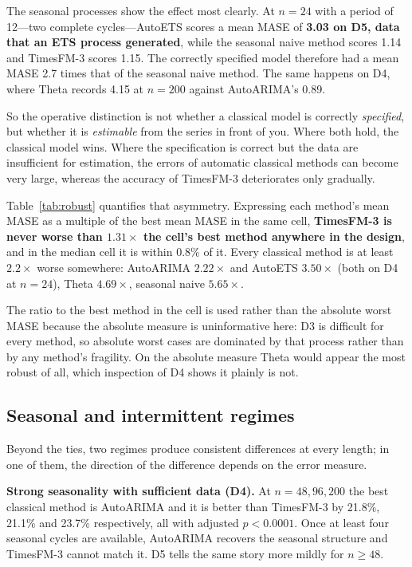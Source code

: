 \documentclass[11pt]{article}
\providecommand{\tableref}[1]{Table~\ref{#1}}
\begin{document}
The seasonal processes show the effect most clearly. At $n = 24$ with a period of 12---two complete
cycles---AutoETS scores a mean MASE of \textbf{3.03 on D5, data that an ETS process generated},
while the seasonal naive method scores 1.14 and TimesFM-3 scores 1.15. The
correctly specified model therefore had a mean MASE 2.7 times that of the seasonal naive method. The same happens on D4, where Theta
records 4.15 at $n = 200$ against AutoARIMA's 0.89.

So the operative distinction is not whether a classical model is correctly \emph{specified},
but whether it is \emph{estimable} from the series in front of you. Where both hold, the
classical model wins. Where the specification is correct but the data are insufficient for
estimation, the errors of automatic classical methods can become very large, whereas the accuracy
of TimesFM-3 deteriorates only gradually.

\tableref{tab:robust} quantifies that asymmetry. Expressing each method's mean MASE as a
multiple of the best mean MASE in the same cell, \textbf{TimesFM-3 is never worse than
$1.31\times$ the cell's best method anywhere in the design}, and in the median cell it is within
0.8\% of it. Every classical method is at least $2.2\times$ worse somewhere: AutoARIMA
$2.22\times$ and AutoETS $3.50\times$ (both on D4 at $n = 24$), Theta $4.69\times$, seasonal
naive $5.65\times$.

The ratio to the best method in the cell is used rather than the absolute worst MASE because the
absolute measure is uninformative here: D3 is difficult for every method, so absolute worst
cases are dominated by that process rather than by any method's fragility. On the absolute
measure Theta would appear the most robust of all, which inspection of D4 shows it plainly is
not.



\subsection{Seasonal and intermittent regimes}
\label{sec:regimes}

Beyond the ties, two regimes produce consistent differences at every length; in one of them,
the direction of the difference depends on the error measure.

\textbf{Strong seasonality with sufficient data (D4).} At
$n = 48, 96, 200$ the best classical method is AutoARIMA and it is better than TimesFM-3 by
21.8\%, 21.1\% and 23.7\% respectively, all with adjusted $p < 0.0001$. Once at least four
seasonal cycles are available, AutoARIMA recovers the seasonal structure and TimesFM-3 cannot
match it. D5 tells the same story more mildly for $n \geq 48$.
\end{document}
